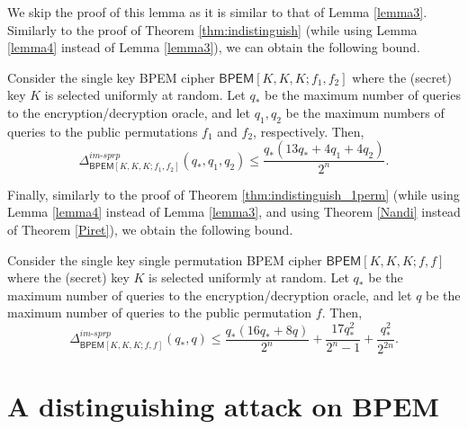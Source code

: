 \documentclass{llncs}
\newcommand{\tx}{\textsf}
\begin{document}
We skip the proof of this lemma as it is similar to that of Lemma \ref{lemma3}.
Similarly to the proof of Theorem \ref{thm:indistinguish} (while using Lemma \ref{lemma4} instead of Lemma \ref{lemma3}), we can obtain the following bound.
\begin{theorem}
\label{thm:indistinguish_1key}
Consider the single key BPEM cipher $\tx{BPEM}[K, K, K;f_1,f_2]$ where the (secret) key
$K$ is selected uniformly at random.
Let $q_{*}$ be the maximum number of queries to the encryption/decryption oracle, and let $q_1, q_2$ be the maximum numbers of queries to the public permutations $f_1$ and $f_2$, respectively. Then, $$\Delta^{im\textit{-}sprp}_{\tx{BPEM}[K,K,K;f_1,f_2]}(q_{*},q_1,q_2)\leq \frac{q_{*}(13q_{*}+4q_1+4q_2)}{2^n}.$$
\end{theorem}

Finally, similarly to the proof of Theorem \ref{thm:indistinguish_1perm} (while using Lemma \ref{lemma4} instead of Lemma \ref{lemma3}, and using Theorem \ref{Nandi} instead of Theorem \ref{Piret}), we obtain the following bound.
\begin{theorem}
\label{thm:indistinguish_1key_1perm}
Consider the single key single permutation BPEM cipher $\tx{BPEM}[K, K, K;f,f]$ where the (secret) key
$K$ is selected uniformly at random.
Let $q_{*}$ be the maximum number of queries to the encryption/decryption oracle, and let $q$ be the maximum number  of queries to the public permutation $f$. Then,
$$\Delta^{im\textit{-}sprp}_{\tx{BPEM}[K,K,K;f,f]}(q_{*},q)\leq \frac{q_{*}(16q_{*}+8q)}{2^n}+\frac{17q_{*}^2}{2^n-1} + \frac{q_{*}^2}{2^{2n}}.$$
\end{theorem}

\section{A distinguishing attack on BPEM}\label{sec:attack}
\end{document}
